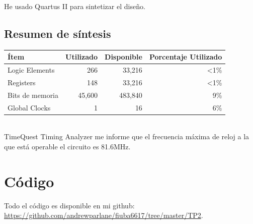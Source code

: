 \documentclass[a4paper]{article}
\begin{document}
He usado Quartus II para sintetizar el diseño.

\subsection{Resumen de síntesis}
\begin{tabular}{| l | r | r | r|}
\hline
\textbf{Ítem} & \textbf{Utilizado} & \textbf{Disponible} & \textbf{Porcentaje Utilizado} \\ \hline
Logic Elements & 266 & 33,216 & \textless 1\% \\
Registers & 148 & 33,216 & \textless 1\% \\ 
Bits de memoria & 45,600 & 483,840 & 9\% \\ 
Global Clocks & 1 & 16 & 6\% \\ \hline
\end{tabular} \\

TimeQuest Timing Analyzer me informe que el frecuencia máxima de reloj a la que está operable el circuito es 81.6MHz.

\section{Código}

Todo el código es disponible en mi github: \url{https://github.com/andrewparlane/fiuba6617/tree/master/TP2}.
\end{document}
